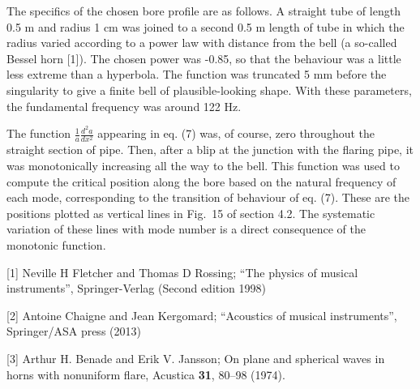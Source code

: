   The specifics of the chosen bore profile are as follows. A straight tube of 
  length 0.5 m and radius 1 cm was joined to a second 0.5 m length of tube in 
  which the radius varied according to a power law with distance from the bell 
  (a so-called Bessel horn [1]). The chosen power was -0.85, so that the 
  behaviour was a little less extreme than a hyperbola. The function was 
  truncated 5 mm before the singularity to give a finite bell of 
  plausible-looking shape. With these parameters, the fundamental frequency was 
  around 122 Hz. 

  The function $\frac{1}{a} \frac{d^2a}{dx^2}$ appearing in eq. (7) was, of 
  course, zero throughout the straight section of pipe. Then, after a blip at 
  the junction with the flaring pipe, it was monotonically increasing all the 
  way to the bell. This function was used to compute the critical position 
  along the bore based on the natural frequency of each mode, corresponding to 
  the transition of behaviour of eq. (7). These are the positions plotted as 
  vertical lines in Fig.\ 15 of section 4.2. The systematic variation of these 
  lines with mode number is a direct consequence of the monotonic function. 

  \sectionreferences{}[1] Neville H Fletcher and Thomas D Rossing; ``The 
  physics of musical instruments'', Springer-Verlag (Second edition 1998) 

  [2] Antoine Chaigne and Jean Kergomard; ``Acoustics of musical instruments'', 
  Springer/ASA press (2013) 

  [3] Arthur H. Benade and Erik V. Jansson; On plane and spherical waves in 
  horns with nonuniform flare, Acustica \textbf{31}, 80--98 (1974). 